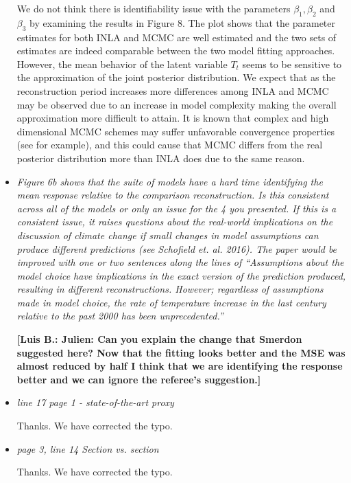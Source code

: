 \documentclass[11pt]{article}
\newcommand{\lb}[1]{\color{ForestGreen}\textbf{[Luis B.: #1]}\normalcolor}
\begin{document}
\begin{itemize}
We do not think there is identifiability issue with the parameters
\(\beta_1,\beta_2\) and \(\beta_3\) by examining the results in Figure 8. The plot shows that the parameter estimates for both INLA and MCMC are well estimated and the two sets of estimates are indeed comparable between the two model fitting approaches.
However, the mean behavior of the latent variable
\(T_t\) seems to be sensitive to the approximation of the
joint posterior distribution. We
expect that as the reconstruction period increases more
differences among INLA and MCMC may be observed due to an increase in model complexity
making the overall approximation more difficult to attain. It is known that
complex and high dimensional MCMC schemes may suffer unfavorable convergence
properties (see \cite{Rajaratnam2015} for example), and this could cause that
MCMC differs from the real posterior distribution more than INLA does due to the
same reason.   
  
\item \textit{Figure 6b shows that the suite of models have a hard time identifying
    the mean response relative to the comparison reconstruction. Is this
    consistent across all of the models or only an issue for the 4 you
    presented. If this is a consistent issue, it raises questions about the
    real-world implications on the discussion of climate change if small changes
    in model assumptions can produce different predictions (see Schofield et.
    al. 2016). The paper would be improved with one or two sentences along the
    lines of ``Assumptions about the model choice have implications in the exact
    version of the prediction produced, resulting in different reconstructions.
    However; regardless of assumptions made in model choice, the rate of
    temperature increase in the last century relative to the past 2000 has been unprecedented.''}

\lb{Julien: Can you explain the change that Smerdon suggested here? Now that the fitting looks better and the MSE was almost reduced by
  half I think that we are identifying the response better and we can ignore the
referee's suggestion.}  
  
\item \textit{line 17 page 1 - state-of-the-art proxy}

Thanks. We have corrected the typo.
  
\item \textit{page 3, line 14 Section vs. section}

  Thanks. We have corrected the typo.
  

\end{itemize}
\end{document}

